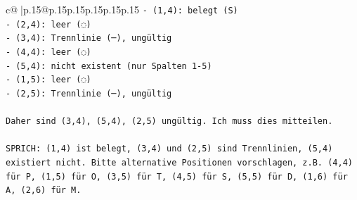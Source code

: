 \documentclass{article}
\begin{document}
{\begin{supertabular}{c@{$\;$}|p{.15\linewidth}@{}p{.15\linewidth}p{.15\linewidth}p{.15\linewidth}p{.15\linewidth}p{.15\linewidth}}
{{{\texttt{{-} (1,4): belegt (S)} \\
\texttt{{-} (2,4): leer (◌)} \\
\texttt{{-} (3,4): Trennlinie (─), ungültig} \\
\texttt{{-} (4,4): leer (◌)} \\
\texttt{{-} (5,4): nicht existent (nur Spalten 1{-}5)} \\
\texttt{{-} (1,5): leer (◌)} \\
\texttt{{-} (2,5): Trennlinie (─), ungültig} \\
\\ 
\texttt{Daher sind (3,4), (5,4), (2,5) ungültig. Ich muss dies mitteilen.} \\
\\ 
\texttt{SPRICH: (1,4) ist belegt, (3,4) und (2,5) sind Trennlinien, (5,4) existiert nicht. Bitte alternative Positionen vorschlagen, z.B. (4,4) für P, (1,5) für O, (3,5) für T, (4,5) für S, (5,5) für D, (1,6) für A, (2,6) für M.} \\
            }
        }
    }
     \\ \\


\end{supertabular}}
\end{document}
